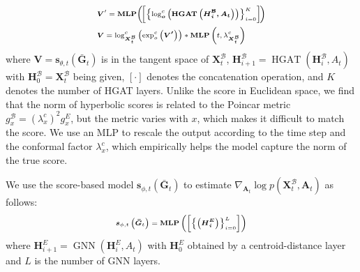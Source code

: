 \documentclass[letterpaper]{article} %
\begin{document}
\begin{equation}
\begin{scriptsize}{
\begin{aligned}
&\boldsymbol{V}^\prime=\operatorname{\textbf{MLP}}\!\left(\!\left[\left\{\log _{\boldsymbol{o}}^{c}\left(\boldsymbol{\operatorname{HGAT}\left(\boldsymbol{H}^\mathcal{B}_{i}, \boldsymbol{A}_{t}\right)}\right)\right\}_{i=0}^{K}\right]\!\right) \\
&\boldsymbol{V} = \log^c_{\boldsymbol{X}^\mathcal{B}_{t}} \left(\exp^c_o
\left( \boldsymbol{V^\prime}\right) \right) * \operatorname{\textbf{MLP}}\left(t,\lambda^c_{\boldsymbol{X}^\mathcal{B}_t}\right)
\end{aligned}
}\end{scriptsize}
\end{equation}
%
where $\boldsymbol{V}=\boldsymbol{s}_{\theta, t}(\boldsymbol{\bar{G}}_{t}) $ is in the tangent space of $\boldsymbol{X}^\mathcal{B}_{t}$, $\boldsymbol{H}^\mathcal{B}_{i+1} = \operatorname{HGAT}(\boldsymbol{H}^\mathcal{B}_i, A_t)$ with $\boldsymbol{H}^\mathcal{B}_0 = \boldsymbol{X}^\mathcal{B}_t$ being given, $[\cdot]$ denotes the concatenation operation, and $K$ denotes the number of HGAT layers.
Unlike the score in Euclidean space, we find that the norm of hyperbolic scores is related to the Poincar metric $g^\mathcal{B}_x=(\lambda^c_x)^2g^E_x$,
but the metric varies with $x$, which makes it difficult to match the score. We use an MLP to rescale the output according to the time step and the conformal factor $\lambda^c_x$, which empirically helps the model capture the norm of the true score.

We use the score-based model $\boldsymbol{s}_{\phi, t}(\boldsymbol{\bar{G}}_{t}) $ to estimate $\nabla_{\boldsymbol{A}_{t}} \log p\left(\boldsymbol{X}^\mathcal{B}_{t},\boldsymbol{A}_{t} \right)$ as follows:
\begin{equation}
\begin{scriptsize}
\boldsymbol{s}_{\phi, t}\left(\boldsymbol{\bar{G}}_{t}\right)=\operatorname{\textbf{MLP}}
\left(\left[\left\{\left(\boldsymbol{\boldsymbol{H}^E_{i}}\right)\right\}_{i=0}^{L}\right]\right)
\end{scriptsize}
\end{equation}
where $\boldsymbol{H}^E_{i+1} = \operatorname{\mathrm{GNN}}(\boldsymbol{H}^E_i,A_t)$ with $\boldsymbol{H}^E_0$ obtained by a centroid-distance layer and $L$ is the number of GNN layers.
\end{document}
